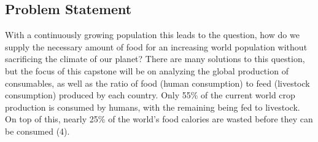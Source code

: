 \documentclass[12pt, a4paper]{article}
\begin{document}
\begin{spacing}{1.1}
	\section{Problem Statement}
	With a continuously growing population this leads to the question, how do we supply the necessary amount of food for an increasing world population without sacrificing the climate of our planet? There are many solutions to this question, but the focus of this capstone will be on analyzing the global production of consumables, as well as the ratio of food (human consumption) to feed (livestock consumption) produced by each country. Only 55\% of the current world crop production is consumed by humans, with the remaining being fed to livestock. On top of this, nearly 25\% of the world's food calories are wasted before they can be consumed (4). \newpage	
	


\end{spacing}
\end{document}
